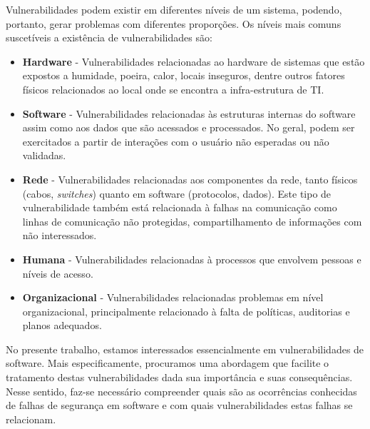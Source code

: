 %

Vulnerabilidades podem existir em diferentes níveis de um sistema, podendo, portanto, gerar problemas com diferentes proporções. Os níveis mais comuns suscetíveis a existência de vulnerabilidades são:

%

\begin{itemize}
\item \textbf{Hardware} - Vulnerabilidades relacionadas ao hardware de sistemas que estão expostos a humidade, poeira, calor, locais inseguros, dentre outros fatores físicos relacionados ao local onde se encontra a infra-estrutura de TI.

\item \textbf{Software} - Vulnerabilidades relacionadas às estruturas internas do software assim como aos dados que são acessados e processados. No geral, podem ser exercitados a partir de interações com o usuário não esperadas ou não validadas.

\item \textbf{Rede} - Vulnerabilidades relacionadas aos componentes da rede, tanto físicos (cabos, \emph{switches}) quanto em software (protocolos, dados). Este tipo de vulnerabilidade também está relacionada à falhas na comunicação como linhas de comunicação não protegidas, compartilhamento de informações com não interessados.

\item \textbf{Humana} - Vulnerabilidades relacionadas à processos que envolvem pessoas e níveis de acesso.

\item \textbf{Organizacional} - Vulnerabilidades relacionadas problemas em nível organizacional, principalmente relacionado à falta de políticas, auditorias e planos adequados.
\end{itemize}

%

No presente trabalho, estamos interessados essencialmente em vulnerabilidades de software. Mais especificamente, procuramos uma abordagem que facilite o tratamento destas vulnerabilidades dada sua importância e suas consequências. Nesse sentido, faz-se necessário compreender quais são as ocorrências conhecidas de falhas de segurança em software e com quais vulnerabilidades estas falhas se relacionam.

%

